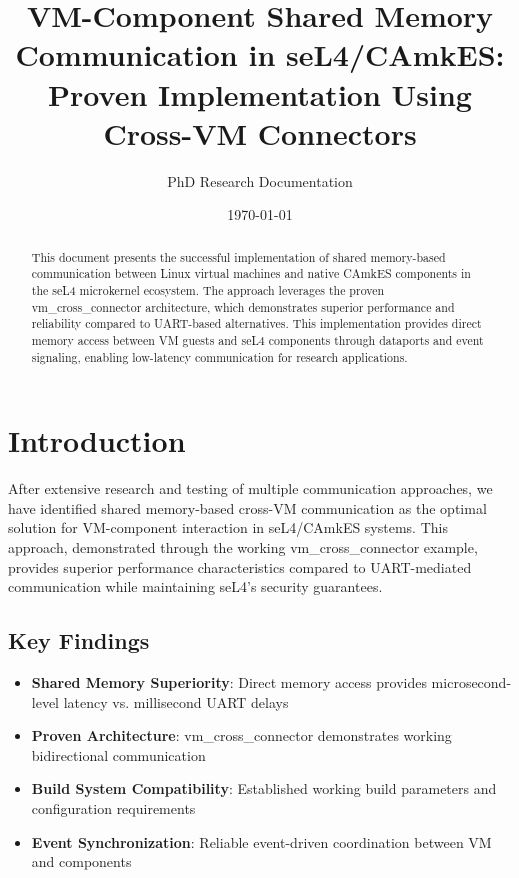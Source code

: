 \documentclass[12pt,a4paper]{article}
\title{VM-Component Shared Memory Communication in seL4/CAmkES:\\
Proven Implementation Using Cross-VM Connectors}
\author{PhD Research Documentation}
\date{\today}
\begin{document}
\maketitle

\begin{abstract}
This document presents the successful implementation of shared memory-based communication between Linux virtual machines and native CAmkES components in the seL4 microkernel ecosystem. The approach leverages the proven vm\_cross\_connector architecture, which demonstrates superior performance and reliability compared to UART-based alternatives. This implementation provides direct memory access between VM guests and seL4 components through dataports and event signaling, enabling low-latency communication for research applications.
\end{abstract}

\tableofcontents
\newpage

\section{Introduction}

After extensive research and testing of multiple communication approaches, we have identified shared memory-based cross-VM communication as the optimal solution for VM-component interaction in seL4/CAmkES systems. This approach, demonstrated through the working vm\_cross\_connector example, provides superior performance characteristics compared to UART-mediated communication while maintaining seL4's security guarantees.

\subsection{Key Findings}

\begin{itemize}
\item \textbf{Shared Memory Superiority}: Direct memory access provides microsecond-level latency vs. millisecond UART delays
\item \textbf{Proven Architecture}: vm\_cross\_connector demonstrates working bidirectional communication
\item \textbf{Build System Compatibility}: Established working build parameters and configuration requirements
\item \textbf{Event Synchronization}: Reliable event-driven coordination between VM and components
\end{itemize}
\end{document}
